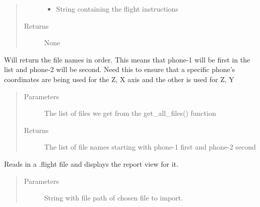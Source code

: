 \documentclass[letterpaper,10pt,english]{sphinxmanual}
\begin{document}
\begin{fulllineitems}
\begin{fulllineitems}
\begin{quote}
\begin{description}
\begin{itemize}
\item {} 
 \textendash{} String containing the flight instructions

\end{itemize}

\item[{Returns}] \leavevmode
None

\end{description}\end{quote}

\end{fulllineitems}


\begin{fulllineitems}
\label{\detokenize{index:src.Controllers.Program_Controller.Controller.get_in_order}}
Will return the file names in order. This means that phone-1 will be first in the list and
phone-2 will be second. Need this to ensure that a specific phone’s coordinates are being
used for the Z, X axis and the other is used for Z, Y
\begin{quote}\begin{description}
\item[{Parameters}] \leavevmode
{} \textendash{} The list of files we get from the get\_all\_files() function

\item[{Returns}] \leavevmode
The list of file names starting with phone-1 first and phone-2 second

\end{description}\end{quote}

\end{fulllineitems}


\begin{fulllineitems}
\label{\detokenize{index:src.Controllers.Program_Controller.Controller.import_flight}}
Reads in a .flight file and displays the report view for it.
\begin{quote}\begin{description}
\item[{Parameters}] \leavevmode
{} \textendash{} String with file path of chosen file to import.


\end{description}
\end{quote}
\end{fulllineitems}
\end{fulllineitems}
\end{document}
